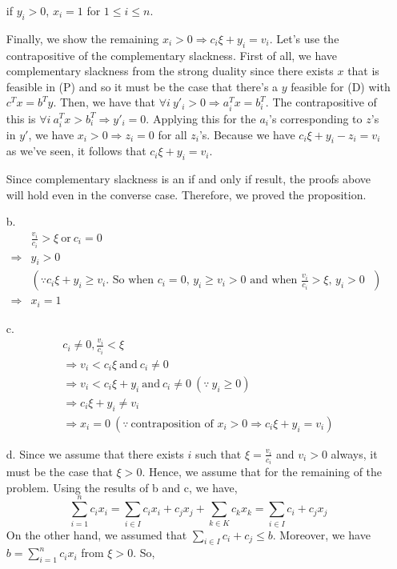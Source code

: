 \documentclass[11pt]{article}
\theoremstyle{remark}
\begin{document}
\begin{itemize}
if $y_i > 0$, $x_i=1$  for $1 \leq i \leq n$.

Finally, we show the remaining $x_i>0\Rightarrow c_i\xi + y_i = v_i$. Let's use the contrapositive of the complementary slackness. First of all, we have complementary slackness from the strong duality since there exists $x$ that is feasible in (P) and so it must be the case that there's a $y$ feasible for (D) with $c^Tx=b^Ty$. Then, we have that $\forall i \ y'_i > 0 \Rightarrow a_i^T x = b_i^T$. The contrapositive of this is $\forall i \  a_i^T x > b_i^T \Rightarrow y'_i = 0$. Applying this for the $a_i$'s corresponding to $z$'s in $y'$, we have $x_i > 0\Rightarrow z_i=0$ for all $z_i$'s. Because we have $c_i \xi + y_i - z_i = v_i$ as we've seen, it follows that $c_i \xi + y_i = v_i$. 

Since complementary slackness is an if and only if result, the proofs above will hold even in the converse case. Therefore, we proved the proposition.

\item[b.]
\begin{align*}
&\frac{v_i}{c_i} > \xi \ \text{or} \ c_i = 0 &\\
\Rightarrow& y_i > 0 &\\
&(\because  \text{$c_i\xi + y_i\geq v_i$. So when $c_i = 0$, $y_i\geq v_i > 0$ and when $\frac{v_i}{c_i} > \xi$, $y_i > 0$ }) &\\
\Rightarrow & x_i =1
\end{align*}

\item[c.]
\begin{align*}
&c_i\neq0,\frac{v_i}{c_i} < \xi &\\
&\Rightarrow v_i < c_i \xi \ \text{and} \ c_i\neq0 &\\
&\Rightarrow v_i < c_i \xi + y_i \ \text{and} \ c_i\neq0 \ (\because \ y_i \geq 0)&\\
&\Rightarrow c_i \xi + y_i \neq v_i &\\
&\Rightarrow x_i = 0 \ (\because \ \text{contraposition of $x_i > 0 \Rightarrow c_i \xi + y_i = v_i$})
\end{align*}

\item[d.]
Since we assume that there exists $i$ such that $\xi = \frac{v_i}{c_i}$ and $v_i > 0$ always, it must be the case that $\xi >0$. Hence, we assume that for the remaining of the problem.
Using the results of b and c, we have,
$$\sum_{i=1}^n c_i x_i = \sum_{i\in I} c_i x_i + c_j x_j + \sum_{k\in K} c_k x_k = \sum_{i\in I} c_i + c_j x_j$$
On the other hand, we assumed that $\sum_{i\in I} c_i  + c_j  \leq b$. Moreover, we have $b=\sum_{i=1}^n c_i x_i$ from $\xi >0$. So,


\end{itemize}
\end{document}
